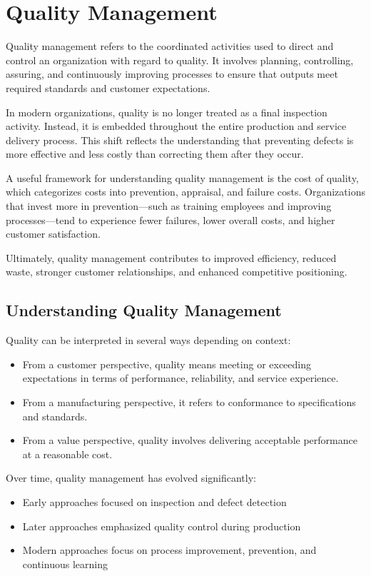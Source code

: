 \documentclass[12pt,a4paper]{article}
\begin{document}
\section*{Quality Management}
Quality management refers to the coordinated activities used to direct and control an organization with regard to quality. It involves planning, controlling, assuring, and continuously improving processes to ensure that outputs meet required standards and customer expectations.

In modern organizations, quality is no longer treated as a final inspection activity. Instead, it is embedded throughout the entire production and service delivery process. This shift reflects the understanding that preventing defects is more effective and less costly than correcting them after they occur.

A useful framework for understanding quality management is the cost of quality, which categorizes costs into prevention, appraisal, and failure costs. Organizations that invest more in prevention—such as training employees and improving processes—tend to experience fewer failures, lower overall costs, and higher customer satisfaction.

Ultimately, quality management contributes to improved efficiency, reduced waste, stronger customer relationships, and enhanced competitive positioning.

\subsection*{Understanding Quality Management}
Quality can be interpreted in several ways depending on context:
\begin{itemize}
    \item From a customer perspective, quality means meeting or exceeding expectations in terms of performance, reliability, and service experience.
    \item From a manufacturing perspective, it refers to conformance to specifications and standards.
    \item From a value perspective, quality involves delivering acceptable performance at a reasonable cost.
\end{itemize}

Over time, quality management has evolved significantly:
\begin{itemize}
    \item Early approaches focused on inspection and defect detection
    \item Later approaches emphasized quality control during production
    \item Modern approaches focus on process improvement, prevention, and continuous learning
\end{itemize}
\end{document}
